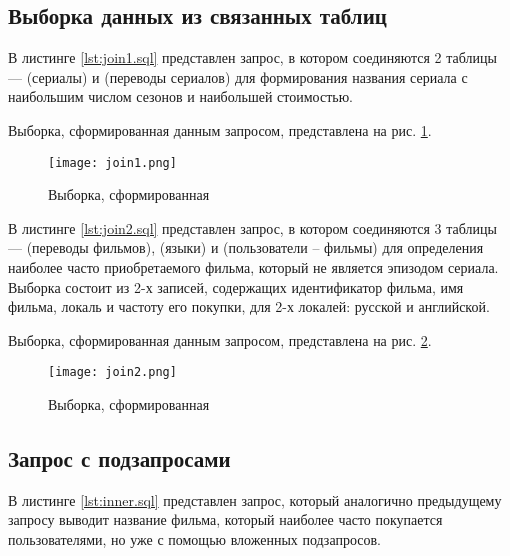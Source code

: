 \subsection{Выборка данных из связанных таблиц}

В листинге \ref{lst:join1.sql} представлен запрос, в котором соединяются 2 таблицы ---  (сериалы) и  (переводы сериалов) для формирования названия сериала с наибольшим числом сезонов и наибольшей стоимостью.



Выборка, сформированная данным запросом, представлена на рис. \ref{fig:join1}.

\begin{figure}[H]
	\centering
	\texttt{[image: join1.png]}
	\caption{Выборка, сформированная }
	\label{fig:join1}
\end{figure}

В листинге \ref{lst:join2.sql} представлен запрос, в котором соединяются 3 таблицы ---  (переводы фильмов),  (языки) и  (пользователи -- фильмы) для определения наиболее часто приобретаемого фильма, который не является эпизодом сериала. Выборка состоит из 2-х записей, содержащих идентификатор фильма, имя фильма, локаль и частоту его покупки, для 2-х локалей: русской и английской.



Выборка, сформированная данным запросом, представлена на рис. \ref{fig:join2}.

\begin{figure}[H]
	\centering
	\texttt{[image: join2.png]}
	\caption{Выборка, сформированная }
	\label{fig:join2}
\end{figure}

\subsection{Запрос с подзапросами}

В листинге \ref{lst:inner.sql} представлен запрос, который аналогично предыдущему запросу выводит название фильма, который наиболее часто покупается пользователями, но уже с помощью вложенных подзапросов.


